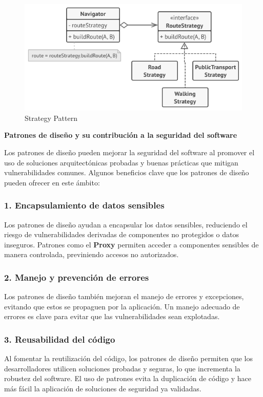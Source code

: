 \begin{figure}[H]
    \centering
    \includegraphics[width=0.5\linewidth]{PatronesSoftware/strategy.png}
    \caption{Strategy Pattern}
    \label{fig:strategy-pattern}
\end{figure}

\textbf{Patrones de diseño y su contribución a la seguridad del software} 

Los patrones de diseño pueden mejorar la seguridad del software al promover el uso de soluciones arquitectónicas probadas y buenas prácticas que mitigan vulnerabilidades comunes. Algunos beneficios clave que los patrones de diseño pueden ofrecer en este ámbito:

\subsubsection{1. \textbf{Encapsulamiento de datos sensibles}}

Los patrones de diseño ayudan a encapsular los datos sensibles, reduciendo el riesgo de vulnerabilidades derivadas de componentes no protegidos o datos inseguros. Patrones como el \textbf{Proxy} permiten acceder a componentes sensibles de manera controlada, previniendo accesos no autorizados.

\subsubsection{2. \textbf{Manejo y prevención de errores}}

Los patrones de diseño también mejoran el manejo de errores y excepciones, evitando que estos se propaguen por la aplicación. Un manejo adecuado de errores es clave para evitar que las vulnerabilidades sean explotadas.

\subsubsection{3. \textbf{Reusabilidad del código}}

Al fomentar la reutilización del código, los patrones de diseño permiten que los desarrolladores utilicen soluciones probadas y seguras, lo que incrementa la robustez del software. El uso de patrones evita la duplicación de código y hace más fácil la aplicación de soluciones de seguridad ya validadas.

